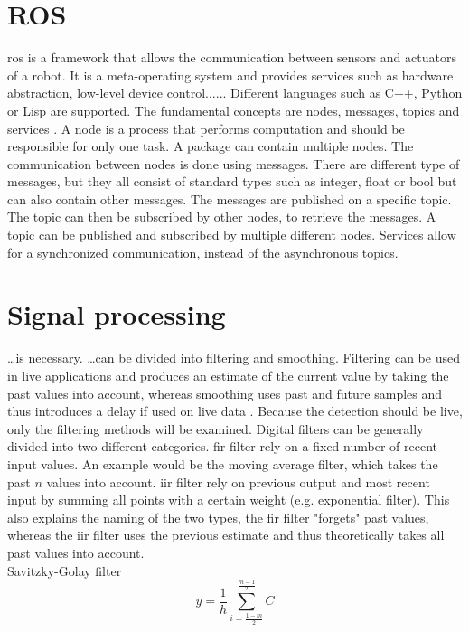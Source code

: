 \section{ROS}
\gls{ros} is a framework that allows the communication between sensors and actuators of a robot.
It is a meta-operating system and provides services such as hardware abstraction, low-level device control......
Different languages such as C++, Python or Lisp are supported.
The fundamental concepts are nodes, messages, topics and services \cite{Quigley2009}.
A node is a process that performs computation and should be responsible for only one task.
A package can contain multiple nodes.
The communication between nodes is done using messages.
There are different type of messages, but they all consist of standard types such as integer, float or bool but can also contain other messages.
The messages are published on a specific topic.
The topic can then be subscribed by other nodes, to retrieve the messages.
A topic can be published and subscribed by multiple different nodes.
Services allow for a synchronized communication, instead of the asynchronous topics.



\section{Signal processing}
\dots is necessary.
\dots can be divided into filtering and smoothing.
Filtering can be used in live applications and produces an estimate of the current value by taking the past values into account, whereas smoothing uses past and future samples and thus introduces a delay if used on live data .
Because the detection should be live, only the filtering methods will be examined.
Digital filters can be generally divided into two different categories.
\gls{fir} filter rely on a fixed number of recent input values. An example would be the moving average filter, which takes the past $n$ values into account.
\gls{iir} filter rely on previous output and most recent input by summing all points with a certain weight (e.g. exponential filter).
This also explains the naming of the two types, the \gls{fir} filter "forgets" past values, whereas the \gls{iir} filter uses the previous estimate and thus theoretically takes all past values into account.\\
Savitzky-Golay filter
\begin{equation}
	y = \frac{1}{h}\sum_{i =\frac{1 - m}{2}}^{\frac{m - 1}{2}}C
\end{equation}


